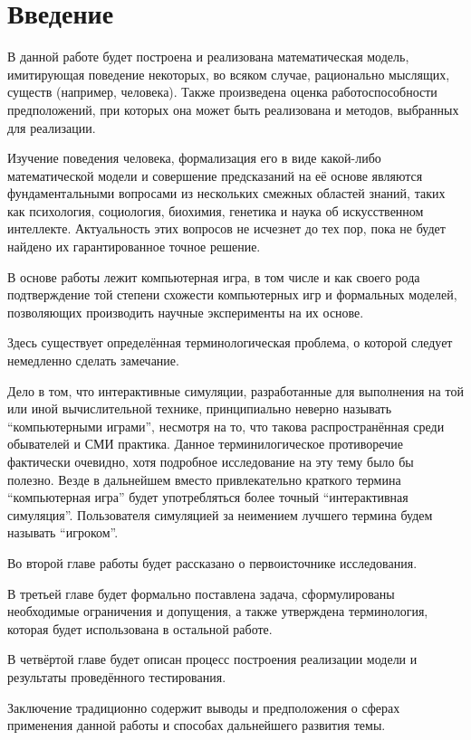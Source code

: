 \chapter{Введение}
В данной работе будет построена и реализована математическая модель, имитирующая поведение некоторых, во всяком случае, рационально мыслящих, существ (например, человека). Также произведена оценка работоспособности предположений, при которых она может быть реализована и методов, выбранных для реализации.

Изучение поведения человека, формализация его в виде какой-либо математической модели и совершение предсказаний на её основе являются фундаментальными вопросами из нескольких смежных областей знаний, таких как психология, социология, биохимия, генетика и наука об искусственном интеллекте. Актуальность этих вопросов не исчезнет до тех пор, пока не будет найдено их гарантированное точное решение.

В основе работы лежит компьютерная игра, в том числе и как своего рода подтверждение той степени схожести компьютерных игр и формальных моделей, позволяющих производить научные эксперименты на их основе.

Здесь существует определённая терминологическая проблема, о которой следует немедленно сделать замечание.

Дело в том, что интерактивные симуляции, разработанные для выполнения на той или иной вычислительной технике, принципиально неверно называть ``компьютерными играми'', несмотря на то, что такова распространённая среди обывателей и СМИ практика. Данное терминилогическое противоречие фактически очевидно, хотя подробное исследование на эту тему было бы полезно. Везде в дальнейшем вместо привлекательно краткого термина ``компьютерная игра'' будет употребляться более точный ``интерактивная симуляция''. Пользователя симуляцией за неимением лучшего термина будем называть ``игроком''.

Во второй главе работы будет рассказано о первоисточнике исследования.

В третьей главе будет формально поставлена задача, сформулированы необходимые ограничения и допущения, а также утверждена терминология, которая будет использована в остальной работе.

В четвёртой главе будет описан процесс построения реализации модели и результаты проведённого тестирования.

Заключение традиционно содержит выводы и предположения о сферах применения данной работы и способах дальнейшего развития темы.
